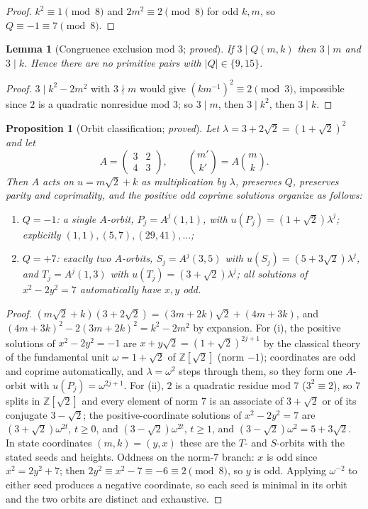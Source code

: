 \documentclass[11pt]{article}
\newtheorem{proposition}[theorem]{Proposition}
\newtheorem{lemma}[theorem]{Lemma}
\theoremstyle{definition}
\theoremstyle{remark}
\newcommand{\ZZ}{\mathbb{Z}}
\newcommand{\lam}{\lambda}
\begin{document}
\begin{proof}
$k^2\equiv1\pmod8$ and $2m^2\equiv2\pmod8$ for odd $k,m$, so $Q\equiv-1\equiv7\pmod8$.
\end{proof}

\begin{lemma}[Congruence exclusion mod 3; \emph{proved}]\label{lem:mod3}
If $3\mid Q(m,k)$ then $3\mid m$ and $3\mid k$. Hence there are no primitive pairs with $|Q|\in\{9,15\}$.
\end{lemma}

\begin{proof}
$3\mid k^2-2m^2$ with $3\nmid m$ would give $(km^{-1})^2\equiv2\pmod3$, impossible since $2$ is a quadratic nonresidue mod $3$; so $3\mid m$, then $3\mid k^2$, then $3\mid k$.
\end{proof}

\begin{proposition}[Orbit classification; \emph{proved}]\label{prop:orbits}
Let $\lam=3+2\sqrt2=(1+\sqrt2)^2$ and let
\[
A=\begin{pmatrix}3&2\\4&3\end{pmatrix},\qquad
\binom{m'}{k'}=A\binom{m}{k}.
\]
Then $A$ acts on $u=m\sqrt2+k$ as multiplication by $\lam$, preserves $Q$, preserves parity and coprimality, and the positive odd coprime solutions organize as follows:
\begin{enumerate}
\item[(i)] $Q=-1$: a single $A$-orbit, $P_j=A^j(1,1)$, with $u(P_j)=(1+\sqrt2)\lam^j$; explicitly $(1,1),(5,7),(29,41),\dots$;
\item[(ii)] $Q=+7$: exactly two $A$-orbits, $S_j=A^j(3,5)$ with $u(S_j)=(5+3\sqrt2)\lam^j$, and $T_j=A^j(1,3)$ with $u(T_j)=(3+\sqrt2)\lam^j$; all solutions of $x^2-2y^2=7$ automatically have $x,y$ odd.
\end{enumerate}
\end{proposition}

\begin{proof}
$(m\sqrt2+k)(3+2\sqrt2)=(3m+2k)\sqrt2+(4m+3k)$, and $(4m+3k)^2-2(3m+2k)^2=k^2-2m^2$ by expansion. For (i), the positive solutions of $x^2-2y^2=-1$ are $x+y\sqrt2=(1+\sqrt2)^{2j+1}$ by the classical theory of the fundamental unit $\omega=1+\sqrt2$ of $\ZZ[\sqrt2]$ (norm $-1$); coordinates are odd and coprime automatically, and $\lam=\omega^2$ steps through them, so they form one $A$-orbit with $u(P_j)=\omega^{2j+1}$. For (ii), $2$ is a quadratic residue mod $7$ ($3^2\equiv2$), so $7$ splits in $\ZZ[\sqrt2]$ and every element of norm $7$ is an associate of $3+\sqrt2$ or of its conjugate $3-\sqrt2$; the positive-coordinate solutions of $x^2-2y^2=7$ are $(3+\sqrt2)\omega^{2t}$, $t\ge0$, and $(3-\sqrt2)\omega^{2t}$, $t\ge1$, and $(3-\sqrt2)\omega^{2}=5+3\sqrt2$. In state coordinates $(m,k)=(y,x)$ these are the $T$- and $S$-orbits with the stated seeds and heights. Oddness on the norm-$7$ branch: $x$ is odd since $x^2=2y^2+7$; then $2y^2\equiv x^2-7\equiv-6\equiv2\pmod 8$, so $y$ is odd. Applying $\omega^{-2}$ to either seed produces a negative coordinate, so each seed is minimal in its orbit and the two orbits are distinct and exhaustive.
\end{proof}
\end{document}
